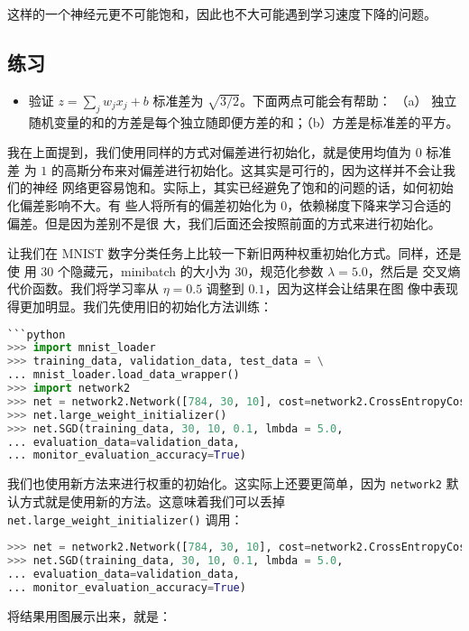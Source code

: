 这样的一个神经元更不可能饱和，因此也不大可能遇到学习速度下降的问题。

\subsection*{练习}

\begin{itemize}
\item 验证 $z=\sum_j w_j x_j + b$ 标准差为 $\sqrt{3/2}$。下面两点可能会有帮助：
  （a） 独立随机变量的和的方差是每个独立随即便方差的和；（b）方差是标准差的平方。
\end{itemize}

我在上面提到，我们使用同样的方式对偏差进行初始化，就是使用均值为 $0$ 标准差
为 $1$ 的高斯分布来对偏差进行初始化。这其实是可行的，因为这样并不会让我们的神经
网络更容易饱和。实际上，其实已经避免了饱和的问题的话，如何初始化偏差影响不大。有
些人将所有的偏差初始化为 $0$，依赖梯度下降来学习合适的偏差。但是因为差别不是很
大，我们后面还会按照前面的方式来进行初始化。

让我们在 MNIST 数字分类任务上比较一下新旧两种权重初始化方式。同样，还是使
用 $30$ 个隐藏元，minibatch 的大小为 $30$，规范化参数 $\lambda=5.0$，然后是
交叉熵代价函数。我们将学习率从 $\eta=0.5$ 调整到 $0.1$，因为这样会让结果在图
像中表现得更加明显。我们先使用旧的初始化方法训练：

\begin{lstlisting}[language=Python]
```python
>>> import mnist_loader
>>> training_data, validation_data, test_data = \
... mnist_loader.load_data_wrapper()
>>> import network2
>>> net = network2.Network([784, 30, 10], cost=network2.CrossEntropyCost)
>>> net.large_weight_initializer()
>>> net.SGD(training_data, 30, 10, 0.1, lmbda = 5.0,
... evaluation_data=validation_data,
... monitor_evaluation_accuracy=True)
\end{lstlisting}

我们也使用新方法来进行权重的初始化。这实际上还要更简单，因为 \lstinline!network2! 默认方式就是使用新的方法。这意味着我们可以丢掉 \lstinline!net.large_weight_initializer()! 调用：

\begin{lstlisting}[language=Python]
>>> net = network2.Network([784, 30, 10], cost=network2.CrossEntropyCost)
>>> net.SGD(training_data, 30, 10, 0.1, lmbda = 5.0,
... evaluation_data=validation_data,
... monitor_evaluation_accuracy=True)
\end{lstlisting}

将结果用图展示出来，就是：

